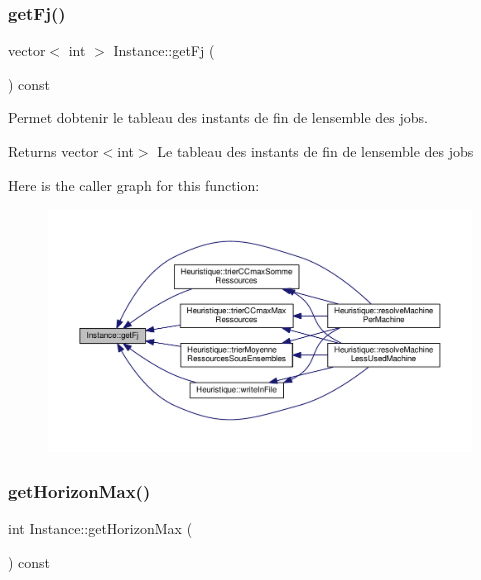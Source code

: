 \subsubsection{\texorpdfstring{get\+Fj()}{getFj()}}
{\footnotesize\ttfamily vector$<$ int $>$ Instance\+::get\+Fj (\begin{DoxyParamCaption}{ }\end{DoxyParamCaption}) const}



Permet d\textquotesingle{}obtenir le tableau des instants de fin de l\textquotesingle{}ensemble des jobs. 

\begin{DoxyReturn}{Returns}
vector$<$int$>$ Le tableau des instants de fin de l\textquotesingle{}ensemble des jobs 
\end{DoxyReturn}
Here is the caller graph for this function\+:\nopagebreak
\begin{figure}[H]
\begin{center}
\leavevmode
\includegraphics[width=350pt]{classInstance_aaf335b7258a7db93b8912f2853133620_icgraph}
\end{center}
\end{figure}
\mbox{\label{classInstance_aeb425f8526606ab97dea1fbbe5973381}} 
\subsubsection{\texorpdfstring{get\+Horizon\+Max()}{getHorizonMax()}}
{\footnotesize\ttfamily int Instance\+::get\+Horizon\+Max (\begin{DoxyParamCaption}{ }\end{DoxyParamCaption}) const}



